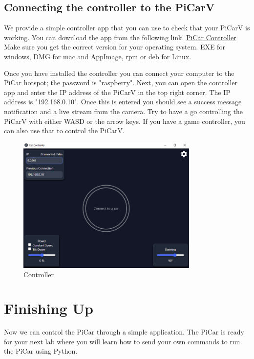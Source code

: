 \documentclass[11pt]{report}
\begin{document}

\section{Connecting the controller to the PiCarV}
We provide a simple controller app that you can use to check that your PiCarV is working. You can download the app from the following link. 
\href{https://github.com/PiCarV/Controller/releases/latest}{PiCar Controller} Make sure you get the correct version for your operating system. EXE for windows, DMG for mac and AppImage, rpm or deb for Linux.


Once you have installed the controller you can connect your computer to the PiCar hotspot; the password is "raspberry". Next, you can open the controller app and enter the IP address of the PiCarV in the top right corner. The IP address is "192.168.0.10". Once this is entered you should see a success message notification and a live stream from the camera. Try to have a go controlling the PiCarV with either WASD or the arrow keys. If you have a game controller, you can also use that to control the PiCarV.


\begin{figure}[h]
    \centering
    \includegraphics[width=0.8\textwidth]{controller.png}
    \caption{Controller}
    \label{fig:Controller}
\end{figure}


\chapter{Finishing Up}
Now we can control the PiCar through a simple application. The PiCar is ready for your next lab where you will learn how to send your own commands to run the PiCar using Python.
\end{document}
